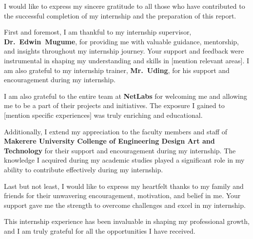 
I would like to express my sincere gratitude to all those who have contributed to the successful completion of my internship and the preparation of this report.

First and foremost, I am thankful to my internship supervisor, \textbf{Dr.\
Edwin\ Mugume}, for providing me with valuable guidance, mentorship, and
insights throughout my internship journey. Your support and feedback were
instrumental in shaping my understanding and skills in [mention relevant
areas]. I am also grateful to my internship trainer, \textbf{Mr.\ Uding}, for his support and encouragement during my internship.

I am also grateful to the entire team at \textbf{NetLabs} for welcoming me and allowing me to be a part of their projects and initiatives. The exposure I gained to [mention specific experiences] was truly enriching and educational.

Additionally, I extend my appreciation to the faculty members and staff of
\textbf{Makerere University Collenge of Engineering Design Art and Technology} for their support and encouragement during my internship. The knowledge I acquired during my academic studies played a significant role in my ability to contribute effectively during my internship.

Last but not least, I would like to express my heartfelt thanks to my family and friends for their unwavering encouragement, motivation, and belief in me. Your support gave me the strength to overcome challenges and excel in my internship.

This internship experience has been invaluable in shaping my professional growth, and I am truly grateful for all the opportunities I have received.

